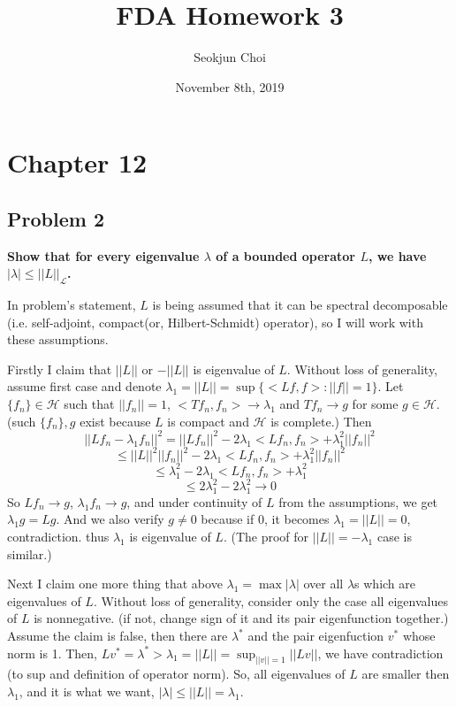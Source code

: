 \documentclass{article}
\begin{document}
\title{FDA Homework 3}
\author{Seokjun Choi}
\date{November 8th, 2019}
\maketitle

\section{Chapter 12}
\subsection{Problem 2}
\textbf{
Show that for every eigenvalue $\lambda$ of a bounded operator $L$,
we have $|\lambda|\leq||L||_{\mathcal{L}}$.
}

In problem's statement, $L$ is being assumed that it can be spectral decomposable 
(i.e. self-adjoint, compact(or, Hilbert-Schmidt) operator), so I will work with these assumptions.

Firstly I claim that $||L||$ or $-||L||$ is eigenvalue of $L$.
Without loss of generality, assume first case and denote $\lambda_1=||L||=\sup\{<Lf,f>:||f||=1\}$.
Let $\{f_n\}\in\mathcal{H}$ such that $||f_n||=1$, $<Tf_n,f_n>\rightarrow\lambda_1$ 
and $Tf_n\rightarrow g$ for some $g\in\mathcal{H}$.
(such $\{f_n\},g$ exist because $L$ is compact and $\mathcal{H}$ is complete.)
Then
\[||Lf_n-\lambda_1 f_n||^2=||Lf_n||^2-2\lambda_1<Lf_n,f_n>+\lambda_1^2||f_n||^2\]
\[\leq ||L||^2||f_n||^2-2\lambda_1<Lf_n,f_n>+\lambda_1^2||f_n||^2\]
\[\leq \lambda_1^2-2\lambda_1<Lf_n,f_n>+\lambda_1^2\]
\[\leq 2\lambda_1^2-2\lambda_1^2\rightarrow 0\]
So $Lf_n\rightarrow g$, $\lambda_1 f_n\rightarrow g$, and under continuity of $L$ from the assumptions,
we get $\lambda_1 g = Lg$. And we also verify $g\neq0$ because if 0, it becomes $\lambda_1=||L||=0$, contradiction.
thus $\lambda_1$ is eigenvalue of $L$.
(The proof for $||L||=-\lambda_1$ case is similar.)

Next I claim one more thing that above $\lambda_1=\max{|\lambda|}$ over all $\lambda$s which are eigenvalues of $L$.
Without loss of generality, consider only the case all eigenvalues of $L$ is nonnegative. 
(if not, change sign of it and its pair eigenfunction together.)
Assume the claim is false, then there are $\lambda^*$ and the pair eigenfuction $v^*$ whose norm is 1.
Then, $Lv^*=\lambda^*>\lambda_1=||L||=\sup_{||v||=1}||Lv||$, we have contradiction (to sup and definition of operator norm).
So, all eigenvalues of $L$ are smaller then $\lambda_1$, and it is what we want,
$|\lambda|\leq||L||=\lambda_1$.
\end{document}

